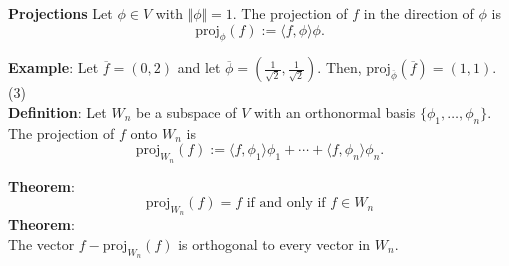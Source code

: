 \documentclass[12pt]{article}
\begin{document}
\noindent \textbf{Projections}
Let $\phi \in V$ with $\Vert \phi \Vert = 1$. The projection of $f$ in the direction of $\phi$ is 
$$\text{proj}_\phi(f):= \langle f,\phi \rangle \phi.$$

\noindent \textbf{Example}: Let $\overline{f} = (0,2)$ and let $\overline{\phi} = (\frac{1}{\sqrt{2}},\frac{1}{\sqrt{2}})$. Then,
$\text{proj}_{\overline{\phi}}(\overline{f}) = (1,1)$. (3) \\

\noindent \textbf{Definition}: Let $W_n$ be a subspace of $V$ with an orthonormal basis $\{\phi_1, \dots, \phi_n\}$. The projection of $f$ onto $W_n$ is 
$$\text{proj}_{W_n}(f):= \langle f, \phi_1\rangle \phi_1 + \cdots + \langle f, \phi_n \rangle \phi_n.$$

\noindent \textbf{Theorem}: 
$$\text{proj}_{W_n}(f)=f \text{ if and only if } f \in W_n$$
\noindent \textbf{Theorem}: \\
The vector $f-\text{proj}_{W_n}(f)$ is orthogonal to every vector in $W_n$. 
\end{document}

